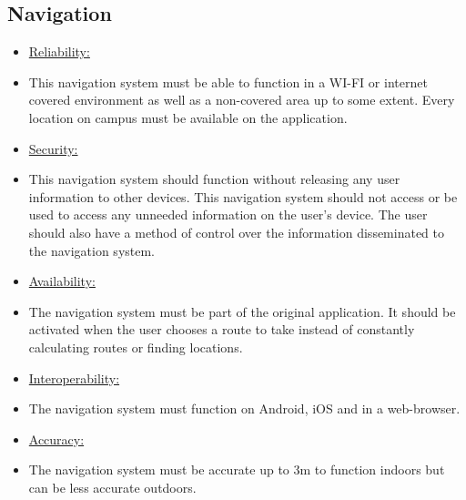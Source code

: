 \documentclass[runningheads,a4paper]{article}
\begin{document}
\subsection{Navigation}
\begin{itemize}
\item \underline{Reliability:} 
\item This navigation system must be able to function in a WI-FI or internet covered environment as well as a non-covered area up to some extent. Every location on campus must be available on the application. 

\item \underline{Security:}
\item This navigation system should function without releasing any user information to other devices. This navigation system should not access or be used to access any unneeded information on the user’s device. The user should also have a method of control over the information disseminated to the navigation system.

\item \underline{Availability:}
\item The navigation system must be part of the original application. It should be activated when the user chooses a route to take instead of constantly calculating routes or finding locations. 

\item \underline{Interoperability:}
\item The navigation system must function on Android, iOS and in a web-browser.

\item \underline{Accuracy:}
\item The navigation system must be accurate up to 3m to function indoors but can be less accurate outdoors. 
\end{itemize}
\end{document}

